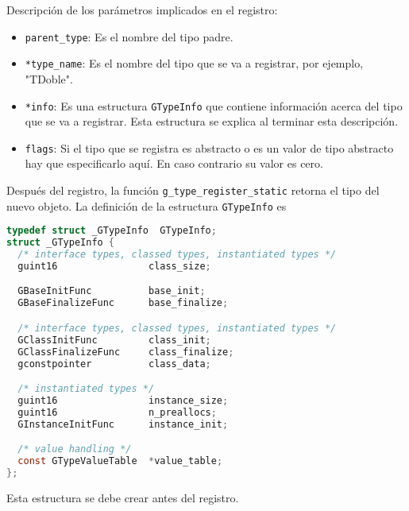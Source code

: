 \newpage
Descripción de los parámetros implicados en el registro:
\begin{itemize}
  \tightlist
\item \texttt{parent\_type}: Es el nombre del tipo padre.
\item \texttt{*type\_name}: Es el nombre del tipo que se va a registrar,
  por ejemplo, "\textsf{TDoble}".
\item \texttt{*info}: Es una estructura \texttt{GTypeInfo} que contiene información acerca
  del tipo que se va a registrar. Esta estructura se explica al terminar esta descripción.
\item \texttt{flags}: Si el tipo que se registra es abstracto o es un valor de tipo
  abstracto\footnotemark{} hay que especificarlo aquí. En caso contrario su valor es cero.
\end{itemize}
Después del registro, la función \texttt{g\_type\_register\_static} retorna
el tipo del nuevo objeto. La definición de la estructura \texttt{GTypeInfo} es
\begin{lstlisting}[language=C]
typedef struct _GTypeInfo  GTypeInfo;
struct _GTypeInfo {
  /* interface types, classed types, instantiated types */
  guint16                class_size;

  GBaseInitFunc          base_init;
  GBaseFinalizeFunc      base_finalize;

  /* interface types, classed types, instantiated types */
  GClassInitFunc         class_init;
  GClassFinalizeFunc     class_finalize;
  gconstpointer          class_data;

  /* instantiated types */
  guint16                instance_size;
  guint16                n_preallocs;
  GInstanceInitFunc      instance_init;

  /* value handling */
  const GTypeValueTable  *value_table;
};
\end{lstlisting}

Esta estructura se debe crear antes del registro.

